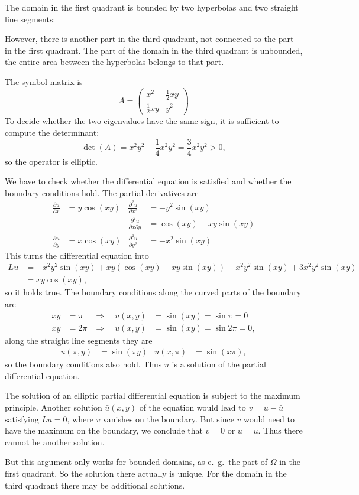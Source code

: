 \begin{loesung}
\begin{teilaufgaben}
\item
The domain in the first quadrant is bounded by two hyperbolas and
two straight line segments:
\begin{center}
\end{center}
However, there is another part in the third quadrant, not connected to
the part in the first quadrant.
The part of the domain in the third quadrant is unbounded, the entire
area between the hyperbolas belongs to that part.
\item
The symbol matrix is
\[
A=\begin{pmatrix}
x^2&\frac12xy\\
\frac12xy&y^2
\end{pmatrix}
\]
To decide whether the two eigenvalues have the same sign, it is sufficient
to compute the determinant:
\[
\det(A)=x^2y^2-\frac14x^2y^2=\frac34x^2y^2>0,
\]
so the operator is elliptic.
\item
We have to check whether the differential equation is satisfied and 
whether the boundary conditions hold.
The partial derivatives are
\begin{align*}
\frac{\partial u}{\partial x}&=y\cos(xy)
&
\frac{\partial^2 u}{\partial x^2}&=-y^2\sin(xy)
\\
&&\frac{\partial^2 u}{\partial x\partial y}&=\cos(xy)-xy\sin(xy)
\\
\frac{\partial u}{\partial y}&=x\cos(xy)
&
\frac{\partial^2 u}{\partial y^2}&=-x^2\sin(xy)
\end{align*}
This turns the differential equation into
\begin{align*}
Lu&=-x^2y^2\sin(xy)+xy(\cos(xy)-xy\sin(xy))-x^2y^2\sin(xy)+3x^2y^2\sin(xy)\
\\
&=xy\cos(xy),
\end{align*}
so it holds true.
The boundary conditions along the curved parts of the boundary are
\begin{align*}
xy&=\pi&\Rightarrow\quad u(x,y)&=\sin(xy)=\sin\pi=0\\
xy&=2\pi&\Rightarrow\quad u(x,y)&=\sin(xy)=\sin2\pi=0,
\end{align*}
along the straight line segments they are
\begin{align*}
u(\pi,y)&=\sin(\pi y)
&u(x,\pi)&=\sin(x\pi),
\end{align*}
so the boundary conditions also hold.
Thus $u$ is a solution of the partial differential equation.
\item
The solution of an elliptic partial differential equation is subject to
the maximum principle.
Another solution $\bar u(x,y)$ of the equation would lead to
$v=u-\bar u$ satisfying $Lu=0$, where $v$ vanishes on the boundary.
But since $v$ would need to have the maximum on the boundary, we 
conclude that $v=0$ or $u=\bar{u}$.
Thus there cannot be another solution.

But this argument only works for bounded domains, as e.~g.~the part of
$\Omega$ in the first quadrant.
So the solution there actually is unique.
For the domain in the third quadrant there may be additional solutions.
\qedhere
\end{teilaufgaben}
\end{loesung}
